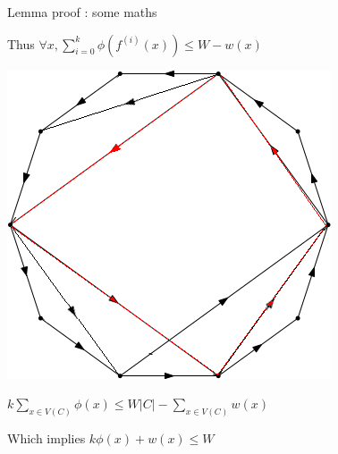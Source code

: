 \documentclass{beamer}
\begin{document}
\begin{frame}{Lemma proof : some maths}

\centering
Thus $\forall x, \sum_{i=0}^{k} \phi(f^{(i)}(x)) \leq W - w(x)$

\pause

\hspace{1cm}

\includegraphics[scale=0.5]{Images/inround_reversed_cycle.png}

\pause
$k\sum_{x\in V(C)} \phi(x) \leq W|C|-\sum_{x\in V(C)} w(x)$

\pause

\hspace{1cm}

Which implies $ k\phi(x)+w(x)\leq W $

\end{frame}
\end{document}
